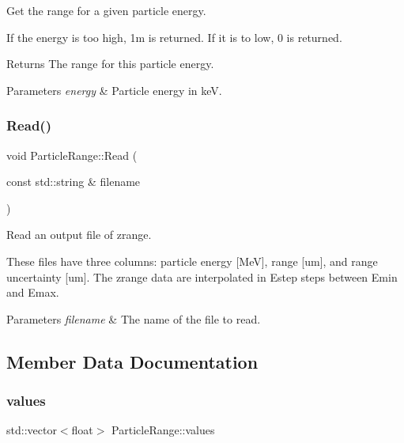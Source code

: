 Get the range for a given particle energy. 

If the energy is too high, 1m is returned. If it is to low, 0 is returned.

\begin{DoxyReturn}{Returns}
The range for this particle energy. 
\end{DoxyReturn}

\begin{DoxyParams}{Parameters}
{\em energy} & Particle energy in keV. \\
\hline
\end{DoxyParams}
\mbox{\label{class_particle_range_ac1e0da5aca629369e93caf8e883da624}} 
\subsubsection{\texorpdfstring{Read()}{Read()}}
{\footnotesize\ttfamily void Particle\+Range\+::\+Read (\begin{DoxyParamCaption}\item[{const std\+::string \&}]{filename }\end{DoxyParamCaption})}



Read an output file of zrange. 

These files have three columns\+: particle energy \mbox{[}MeV\mbox{]}, range \mbox{[}um\mbox{]}, and range uncertainty \mbox{[}um\mbox{]}. The zrange data are interpolated in Estep steps between Emin and Emax. 
\begin{DoxyParams}{Parameters}
{\em filename} & The name of the file to read. \\
\hline
\end{DoxyParams}


\subsection{Member Data Documentation}
\mbox{\label{class_particle_range_ad9189754855416cfab8079c6baf97217}} 
\subsubsection{\texorpdfstring{values}{values}}
{\footnotesize\ttfamily std\+::vector$<$float$>$ Particle\+Range\+::values\hspace{0.3cm}{\ttfamily [private]}}



